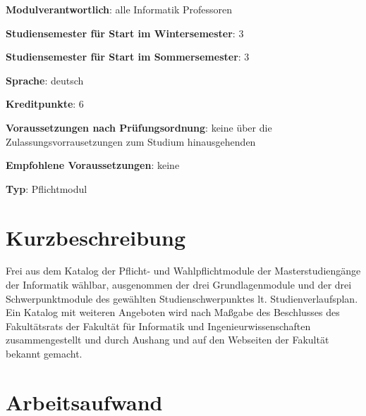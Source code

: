 \begin{modulHead}
\textbf{Modulverantwortlich}: alle Informatik
Professoren
\end{modulHead}
\begin{modulHead}
\textbf{Studiensemester
für Start im Wintersemester}:
3
\end{modulHead}
\begin{modulHead}
\textbf{Studiensemester für Start
im Sommersemester}:
3
\end{modulHead}
\begin{modulHead}
\textbf{Sprache}:
deutsch
\end{modulHead}
\begin{modulHead}
\textbf{Kreditpunkte}:
6
\end{modulHead}
\begin{modulHead}
\textbf{Voraussetzungen nach
Prüfungsordnung}: keine über die Zulassungsvorrausetzungen zum Studium
hinausgehenden
\end{modulHead}
\begin{modulHead}
\textbf{Empfohlene
Voraussetzungen}: keine
\end{modulHead}
\begin{modulHead}
\textbf{Typ}:
Pflichtmodul
\end{modulHead}


\section*{Kurzbeschreibung\label{/mi-2017/modulbeschreibungen-master/MA_All_Modul_Wahlpflichtmodule}}\label{kurzbeschreibungpathlabelmi-2017modulbeschreibungen-mastermaux5fallux5fmodulux5fwahlpflichtmodule}

Frei aus dem Katalog der Pflicht- und Wahlpflichtmodule der
Masterstudiengänge der Informatik wählbar, ausgenommen der drei
Grundlagenmodule und der drei Schwerpunktmodule des gewählten
Studienschwerpunktes lt. Studienverlaufsplan. Ein Katalog mit weiteren
Angeboten wird nach Maßgabe des Beschlusses des Fakultätsrats der
Fakultät für Informatik und Ingenieurwissenschaften zusammengestellt und
durch Aushang und auf den Webseiten der Fakultät bekannt gemacht.

\section*{Arbeitsaufwand\label{/mi-2017/modulbeschreibungen-master/MA_All_Modul_Wahlpflichtmodule}}\label{arbeitsaufwandpathlabelmi-2017modulbeschreibungen-mastermaux5fallux5fmodulux5fwahlpflichtmodule}

